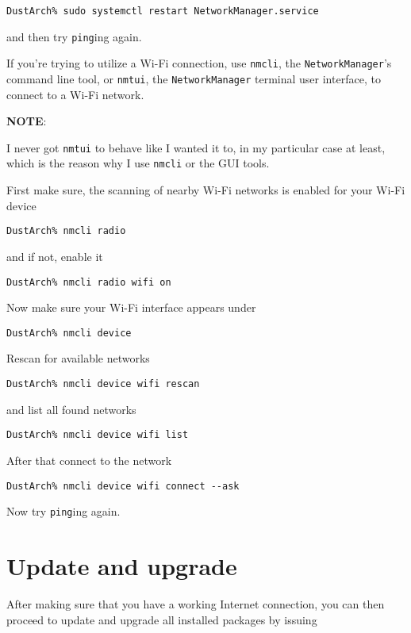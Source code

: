 \documentclass[9pt]{report}
\newcommand{\admonition}[2]{\textbf{#1}: {#2}}
\begin{document}
\begin{verbatim}
DustArch% sudo systemctl restart NetworkManager.service
\end{verbatim}

and then try \texttt{ping}ing again.


If you’re trying to utilize a Wi-Fi connection, use \texttt{nmcli}, the \texttt{NetworkManager}'s command line tool, or \texttt{nmtui}, the \texttt{NetworkManager} terminal user interface, to connect to a Wi-Fi network.


\admonition{NOTE}{I never got \texttt{nmtui} to behave like I wanted it to, in my particular case at least, which is the reason why I use \texttt{nmcli} or the GUI tools.

}
First make sure, the scanning of nearby Wi-Fi networks is enabled for your Wi-Fi device


\begin{verbatim}
DustArch% nmcli radio
\end{verbatim}

and if not, enable it


\begin{verbatim}
DustArch% nmcli radio wifi on
\end{verbatim}

Now make sure your Wi-Fi interface appears under


\begin{verbatim}
DustArch% nmcli device
\end{verbatim}

Rescan for available networks


\begin{verbatim}
DustArch% nmcli device wifi rescan
\end{verbatim}

and list all found networks


\begin{verbatim}
DustArch% nmcli device wifi list
\end{verbatim}

After that connect to the network


\begin{verbatim}
DustArch% nmcli device wifi connect --ask
\end{verbatim}

Now try \texttt{ping}ing again.



\vfill\eject

\hypertarget{x-update-and-upgrade}{\section{Update and upgrade}}
After making sure that you have a working Internet connection, you can then proceed to update and upgrade all installed packages by issuing
\end{document}
